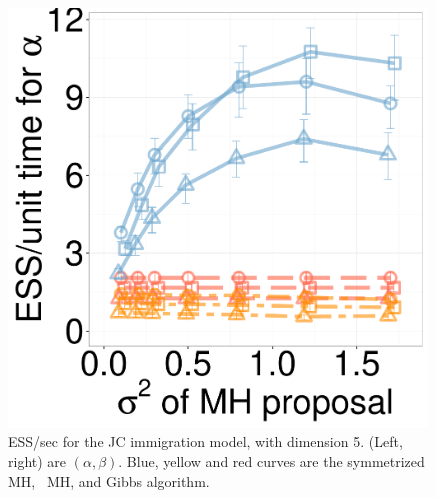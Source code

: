 	\begin{figure}	
  \centering
  \begin{minipage}[!hp]{0.25\linewidth}
  \centering
    \includegraphics [width=0.99\textwidth, angle=0]{figs/new_whole_exp_figs/jc_alpha.pdf}
  \end{minipage}
  \begin{minipage}[!hp]{0.74\linewidth}
    \caption{ESS/sec for the JC immigration model, with 
      dimension 5. (Left, right) are $(\alpha, \beta)$. Blue, yellow and red curves are the symmetrized MH,
  \naive\ MH, and Gibbs algorithm.}
     \label{fig:ESS_pc_55}
  \end{minipage}


  \end{figure}


